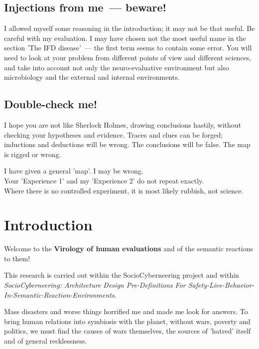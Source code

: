 \documentclass[13pt,a4paper]{article}
\newcommand{\kav}[1]{\textcolor{sce-red}{'#1'}}
\newenvironment{warnbox}[1]{%
  \vspace{0.9em}
  \begin{mdframed}[
    linecolor=sce-red, linewidth=4pt,
    topline=false, rightline=false, bottomline=false,
    backgroundcolor=bg-red,
    innerleftmargin=12pt, innerrightmargin=10pt,
    innertopmargin=8pt, innerbottommargin=8pt,
    skipabove=0pt, skipbelow=0pt
  ]
  \noindent{\montserrat\normalsize\bfseries\color{sce-red}#1}\par\vspace{4pt}%
  \ignorespaces
}{%
  \end{mdframed}
  \vspace{0.6em}
}
\begin{document}
\subsection{Injections from me~--- beware!}

I allowed myself some reasoning in the introduction; it may not be that useful.
Be careful with my evaluation. I may have chosen not the most useful name in the section
\kav{The IFD disease}~--- the first term seems to contain some error.
You will need to look at your problem from different points of view and different sciences,
and take into account not only the neuro-evaluative environment but also microbiology and
the external and internal environments.

\subsection{Double-check me!}

I hope you are not like Sherlock Holmes, drawing conclusions hastily, without checking your
hypotheses and evidence. Traces and clues can be forged; inductions and deductions will be
wrong. The conclusions will be false. The map is rigged or wrong.

\begin{warnbox}{No jump to conclusions!}
I have given a general \kav{map}. I may be wrong.\\
Your \kav{Experience 1} and my \kav{Experience 2} do not repeat exactly.\\
Where there is no controlled experiment, it is most likely rubbish, not science.
\end{warnbox}

\section{Introduction}

Welcome to the \textbf{Virology of human evaluations} and of the semantic reactions to them!

This research is carried out within the SocioCyberneering project and within
\textit{SocioCyberneering: Architecture Design Pre-Definitions For Safety-Live-Behavior-In-Semantic-Reaction-Environments}.

Mass disasters and worse things horrified me and made me look for answers.
To bring human relations into symbiosis with the planet, without wars, poverty and politics,
we must find the causes of wars themselves, the sources of \kav{hatred} itself and of general
recklessness.
\end{document}
